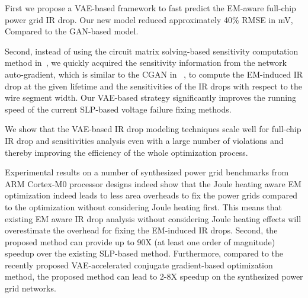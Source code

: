 \begin{itemlist}
	
\item First we propose a VAE-based framework to fast predict the EM-aware full-chip power grid IR drop. Our new model reduced approximately 40$\%$ RMSE in mV, Compared to the GAN-based model.

\item Second, instead of using the circuit matrix solving-based sensitivity computation method in~\cite{Sukharev:2019pg}, we quickly acquired the sensitivity information from the network auto-gradient,  which is similar to the CGAN in ~\cite{ZhouJin:ICCAD'20}, to compute the EM-induced IR drop at the given lifetime and the sensitivities of the IR drops with respect to the wire segment width.  Our VAE-based strategy significantly improves the running speed of the current SLP-based voltage failure fixing methods.

\item We show that the VAE-based IR drop modeling techniques scale well for full-chip IR drop and sensitivities analysis even with a large number of violations and thereby improving the efficiency of the whole optimization process.
  
	

\item Experimental results on a number of synthesized power grid
  benchmarks from ARM Cortex-M0 processor designs indeed show that
  the Joule heating aware EM optimization indeed leads to
  less area overheads to fix the power grids compared to the
  optimization without considering Joule heating first. This means
  that existing EM aware IR drop analysis without considering Joule
  heating effects will overestimate the overhead for fixing
  the EM-induced IR drops. Second, the proposed method can
  provide up to 90X (at least one order of magnitude) speedup over the
  existing SLP-based method.
  Furthermore, compared to the recently
  proposed VAE-accelerated conjugate gradient-based optimization method,
  the proposed method can lead to 2-8X speedup on the synthesized
  power grid networks.
  
	
\end{itemlist}

